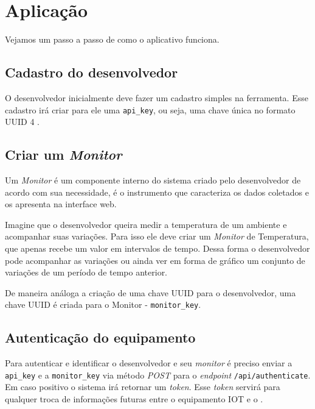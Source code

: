 \section{Aplicação}\label{aplicauxe7uxe3o}

Vejamos um passo a passo de como o aplicativo funciona.

\subsection{Cadastro do desenvolvedor}\label{cadastro-do-desenvolvedor}

O desenvolvedor inicialmente deve fazer um cadastro simples na
ferramenta. Esse cadastro irá criar para ele uma \texttt{api\_key}, ou
seja, uma chave única no formato UUID 4 \cite{rfc4122:2005}.

\subsection{Criar um \emph{Monitor}}\label{criar-um-monitor}

Um \emph{Monitor} é um componente interno do sistema criado pelo
desenvolvedor de acordo com sua necessidade, é o instrumento que
caracteriza os dados coletados e os apresenta na interface web.

Imagine que o desenvolvedor queira medir a temperatura de um ambiente e
acompanhar suas variações. Para isso ele deve criar um \emph{Monitor} de
Temperatura, que apenas recebe um valor em intervalos de tempo. Dessa
forma o desenvolvedor pode acompanhar as variações ou ainda ver em forma
de gráfico um conjunto de variações de um período de tempo anterior.

De maneira análoga a criação de uma chave UUID para o desenvolvedor, uma
chave UUID é criada para o Monitor - \texttt{monitor\_key}.

\subsection{Autenticação do
equipamento}\label{autenticauxe7uxe3o-do-equipamento}

Para autenticar e identificar o desenvolvedor e seu \emph{monitor} é
preciso enviar a \texttt{api\_key} e a \texttt{monitor\_key} via método
\emph{POST} para o \emph{endpoint} \texttt{/api/authenticate}. Em caso
positivo o sistema irá retornar um \emph{token}. Esse \emph{token}
servirá para qualquer troca de informações futuras entre o equipamento
IOT e o \wm.

